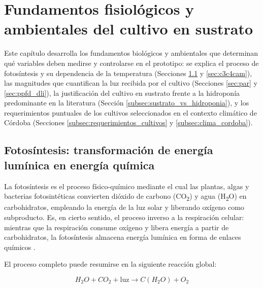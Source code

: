 
\newcommand{\FALTACITA}[1]{\textcolor{red}{\textbf{[CITA: #1]}}}

\chapter{Fundamentos fisiológicos y ambientales del cultivo en sustrato}
\label{cha:cultivo}

Este capítulo desarrolla los fundamentos biológicos y ambientales que determinan qué variables deben medirse y controlarse en el prototipo: se explica el proceso de fotosíntesis y su dependencia de la temperatura (Secciones \ref{sec:fotosintesis} y \ref{sec:c3c4cam}), las magnitudes que cuantifican la luz recibida por el cultivo (Secciones \ref{sec:par} y \ref{sec:ppfd_dli}), la justificación del cultivo en sustrato frente a la hidroponía predominante en la literatura (Sección \ref{subsec:sustrato_vs_hidroponia}), y los requerimientos puntuales de los cultivos seleccionados en el contexto climático de Córdoba (Secciones \ref{subsec:requerimientos_cultivos} y \ref{subsec:clima_cordoba}).

\section{Fotosíntesis: transformación de energía lumínica en energía química}
\label{sec:fotosintesis}

La fotosíntesis es el proceso físico-químico mediante el cual las plantas, algas y bacterias fotosintéticas convierten dióxido de carbono (CO\textsubscript{2}) y agua (H\textsubscript{2}O) en carbohidratos, empleando la energía de la luz solar y liberando oxígeno como subproducto. Es, en cierto sentido, el proceso inverso a la respiración celular: mientras que la respiración consume oxígeno y libera energía a partir de carbohidratos, la fotosíntesis almacena energía lumínica en forma de enlaces químicos \cite{ramos2015}.

El proceso completo puede resumirse en la siguiente reacción global:

\begin{equation}
    H_2O + CO_2 + \text{luz} \rightarrow C(H_2O) + O_2
    \label{eq:fotosintesis_global}
\end{equation}


